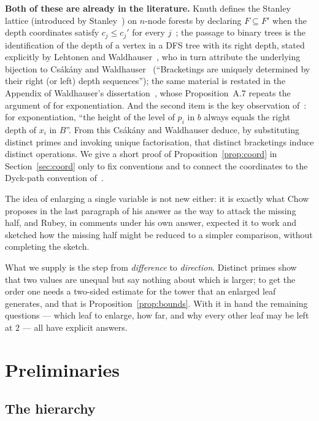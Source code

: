 \documentclass[11pt,a4paper]{article}
\theoremstyle{plain}
\theoremstyle{definition}
\begin{document}
\textbf{Both of these are already in the literature.} Knuth defines the Stanley lattice
(introduced by Stanley~\cite[pp.~222--223]{Sta})
on $n$-node forests by declaring $F\subseteq F'$ when the depth coordinates satisfy
$c_j\le c_j'$ for every $j$~\cite[\S7.2.1.6, exercise 28 and Fig.~41]{Knuth}; the passage
to binary trees is the identification of the depth of a vertex in a DFS tree with its
right depth, stated explicitly by Lehtonen and Waldhauser~\cite[\S2.5]{LW}, who in turn
attribute the underlying bijection to Cs\'ak\'any and Waldhauser~\cite[2.8]{CsW}
(``Bracketings are uniquely determined by their right (or left) depth sequences''); the
same material is restated in the Appendix of Waldhauser's dissertation~\cite{Wal}, whose
Proposition~A.7 repeats the argument of \cite[3.4]{CsW} for exponentiation.
And the second item is the key observation of~\cite[3.4]{CsW}: for exponentiation, ``the
height of the level of $p_i$ in $b$ always equals the right depth of $x_i$ in $B$''.
From this Cs\'ak\'any and Waldhauser deduce, by substituting distinct primes and
invoking unique factorisation, that distinct bracketings induce distinct operations. We
give a short proof of Proposition~\ref{prop:coord} in Section~\ref{sec:coord} only to
fix conventions and to connect the coordinates to the Dyck-path convention of~\cite{MO}.

The idea of enlarging a single variable is not new either: it is exactly what Chow
proposes in the last paragraph of his answer as the way to attack the missing half, and
Rubey, in comments under his own answer, expected it to work and sketched how the missing
half might be reduced to a simpler comparison, without completing the sketch.

What we supply is the step from \emph{difference} to \emph{direction}. Distinct primes
show that two values are unequal but say nothing about which is larger; to get the
order one needs a two-sided estimate for the tower that an enlarged leaf generates,
and that is Proposition~\ref{prop:bounds}. With it in hand the remaining questions ---
which leaf to enlarge, how far, and why every other leaf may be left at $2$ --- all have
explicit answers.

\section{Preliminaries}\label{sec:prelim}

\subsection{The hierarchy}
\end{document}

